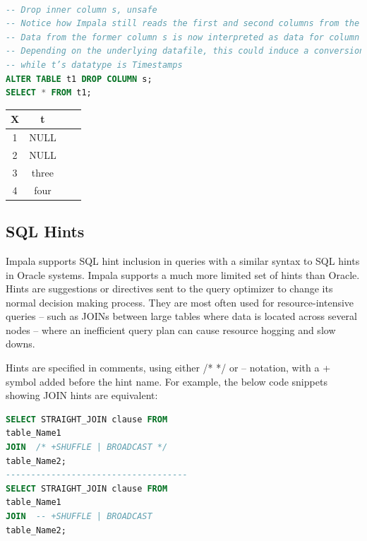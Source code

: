 \documentclass[onecolumn, draftclsnofoot,10pt, compsoc]{IEEEtran}
\begin{document}
    \begin{center}
    \begin{lstlisting}[language=SQL]

-- Drop inner column s, unsafe
-- Notice how Impala still reads the first and second columns from the datafile
-- Data from the former column s is now interpreted as data for column t 
-- Depending on the underlying datafile, this could induce a conversion error, because s’s datatype was Strings,
-- while t’s datatype is Timestamps
ALTER TABLE t1 DROP COLUMN s;
SELECT * FROM t1;

\end{lstlisting}
\end{center}

\begin{center}
\begin{tabular}{|c|c|c|c|}
\hline
X & t \\
\hline
1 & NULL \\
\hline
2 & NULL \\
\hline
3 & three \\
\hline
4 & four \\
\hline
\end{tabular}
\end{center}

    \subsection{SQL Hints}
Impala supports SQL hint inclusion in queries with a similar syntax to SQL hints in Oracle systems. Impala supports a much more limited set of hints than Oracle.  
Hints are suggestions or directives sent to the query optimizer to change its normal decision making process. 
They are most often used for resource-intensive queries --  such as JOINs between large tables where data is located across several nodes -- where an inefficient query plan can cause resource hogging and slow downs. 

Hints are specified in comments, using either  /* */ or -- notation, with a + symbol added before the hint name. 
For example, the below code snippets showing JOIN hints are equivalent:

    \begin{center}
    \begin{lstlisting}[language=SQL]
SELECT STRAIGHT_JOIN clause FROM
table_Name1
JOIN  /* +SHUFFLE | BROADCAST */
table_Name2;
------------------------------------
SELECT STRAIGHT_JOIN clause FROM
table_Name1
JOIN  -- +SHUFFLE | BROADCAST
table_Name2;

\end{lstlisting}
\end{center}
\end{document}
